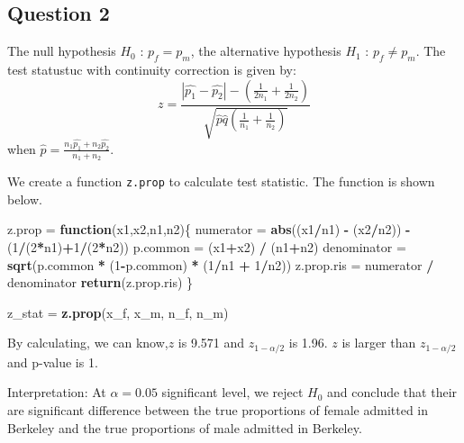 \documentclass[]{article}
\newenvironment{Shaded}{\begin{snugshade}}{\end{snugshade}}
\newcommand{\KeywordTok}[1]{\textcolor[rgb]{0.13,0.29,0.53}{\textbf{#1}}}
\newcommand{\DecValTok}[1]{\textcolor[rgb]{0.00,0.00,0.81}{#1}}
\newcommand{\StringTok}[1]{\textcolor[rgb]{0.31,0.60,0.02}{#1}}
\newcommand{\ControlFlowTok}[1]{\textcolor[rgb]{0.13,0.29,0.53}{\textbf{#1}}}
\newcommand{\OperatorTok}[1]{\textcolor[rgb]{0.81,0.36,0.00}{\textbf{#1}}}
\newcommand{\NormalTok}[1]{#1}
\begin{document}
\subsection{Question 2}\label{question-2-3}

The null hypothesis \(H_0\) : \(p_f = p_m\), the alternative hypothesis
\(H_1\) : \(p_f \neq p_m\). The test statustuc with continuity
correction is given by:
\[ z = \frac{|\hat{p_1}-\hat{p_2}|-(\frac{1}{2n_1}+\frac{1}{2n_2})}{\sqrt{\hat{p}\hat{q}(\frac{1}{n_1}+\frac{1}{n_2})}} \]
when \(\hat{p} = \frac{n_1\hat{p_1}+n_2\hat{p_2}}{n_1+n_2}\).

We create a function \texttt{z.prop} to calculate test statistic. The
function is shown below.

\begin{Shaded}
\begin{Highlighting}[]
\NormalTok{z.prop =}\StringTok{ }\ControlFlowTok{function}\NormalTok{(x1,x2,n1,n2)\{}
\NormalTok{  numerator =}\StringTok{ }\KeywordTok{abs}\NormalTok{((x1}\OperatorTok{/}\NormalTok{n1) }\OperatorTok{-}\StringTok{ }\NormalTok{(x2}\OperatorTok{/}\NormalTok{n2)) }\OperatorTok{-}\StringTok{ }\NormalTok{(}\DecValTok{1}\OperatorTok{/}\NormalTok{(}\DecValTok{2}\OperatorTok{*}\NormalTok{n1)}\OperatorTok{+}\DecValTok{1}\OperatorTok{/}\NormalTok{(}\DecValTok{2}\OperatorTok{*}\NormalTok{n2))}
\NormalTok{  p.common =}\StringTok{ }\NormalTok{(x1}\OperatorTok{+}\NormalTok{x2) }\OperatorTok{/}\StringTok{ }\NormalTok{(n1}\OperatorTok{+}\NormalTok{n2)}
\NormalTok{  denominator =}\StringTok{ }\KeywordTok{sqrt}\NormalTok{(p.common }\OperatorTok{*}\StringTok{ }\NormalTok{(}\DecValTok{1}\OperatorTok{-}\NormalTok{p.common) }\OperatorTok{*}\StringTok{ }\NormalTok{(}\DecValTok{1}\OperatorTok{/}\NormalTok{n1 }\OperatorTok{+}\StringTok{ }\DecValTok{1}\OperatorTok{/}\NormalTok{n2))}
\NormalTok{  z.prop.ris =}\StringTok{ }\NormalTok{numerator }\OperatorTok{/}\StringTok{ }\NormalTok{denominator}
  \KeywordTok{return}\NormalTok{(z.prop.ris)}
\NormalTok{\}}

\NormalTok{z_stat =}\StringTok{ }\KeywordTok{z.prop}\NormalTok{(x_f, x_m, n_f, n_m)}
\end{Highlighting}
\end{Shaded}

By calculating, we can know,\(z\) is 9.571 and \(z_{1-\alpha/2}\) is
1.96. \(z\) is larger than \(z_{1-\alpha/2}\) and p-value is 1.

Interpretation: At \(\alpha = 0.05\) significant level, we reject
\(H_0\) and conclude that their are significant difference between the
true proportions of female admitted in Berkeley and the true proportions
of male admitted in Berkeley.
\end{document}
